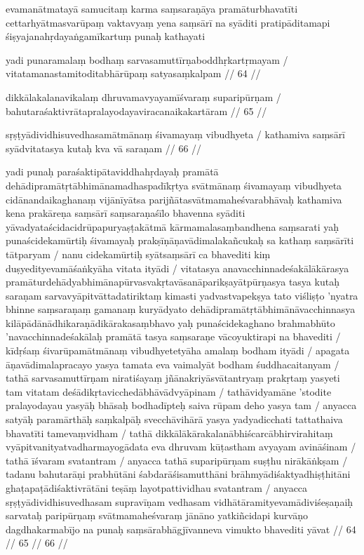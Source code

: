 evamanātmatayā samucitaṃ karma saṃsaraṇāya pramāturbhavatīti cettarhyātmasvarūpaṃ vaktavyaṃ yena saṃsārī na syāditi pratipāditamapi śiṣyajanahṛdayaṅgamīkartuṃ punaḥ kathayati

yadi punaramalaṃ bodhaṃ sarvasamuttīrṇaboddhṛkartṛmayam  /
vitatamanastamitoditabhārūpaṃ satyasaṃkalpam  // 64  //

dikkālakalanavikalaṃ dhruvamavyayamīśvaraṃ suparipūrṇam  /
bahutaraśaktivrātapralayodayaviracanaikakartāram  // 65  //

sṛṣṭyādividhisuvedhasamātmānaṃ śivamayaṃ vibudhyeta  /
kathamiva saṃsārī syādvitatasya kutaḥ kva vā saraṇam  // 66  //

yadi punaḥ paraśaktipātaviddhahṛdayaḥ pramātā dehādipramātṛtābhimānamadhaspadīkṛtya svātmānaṃ śivamayaṃ vibudhyeta cidānandaikaghanaṃ vijānīyātsa parijñātasvātmamaheśvarabhāvaḥ kathamiva kena prakāreṇa saṃsārī saṃsaraṇaśīlo bhavenna syāditi yāvadyataścidacidrūpapuryaṣṭakātmā kārmamalasaṃbandhena saṃsarati yaḥ punaścidekamūrtiḥ śivamayaḥ prakṣīṇāṇavādimalakañcukaḥ sa kathaṃ saṃsārīti tātparyam  / nanu cidekamūrtiḥ syātsaṃsārī ca bhavediti kiṃ duṣyedityevamāśaṅkyāha vitata ityādi  / vitatasya anavacchinnadeśakālākārasya pramāturdehādyabhimānapūrvasvakṛtavāsanāparikṣayātpūrṇasya tasya kutaḥ saraṇam sarvavyāpitvāttadatiriktaṃ kimasti yadvastvapekṣya tato viśliṣṭo 'nyatra bhinne saṃsaraṇaṃ gamanaṃ kuryādyato dehādipramātṛtābhimānāvacchinnasya kilāpādānādhikaraṇādikārakasaṃbhavo yaḥ punaścidekaghano brahmabhūto 'navacchinnadeśakālaḥ pramātā tasya saṃsaraṇe vācoyuktirapi na bhavediti  / kīdṛśaṃ śivarūpamātmānaṃ vibudhyetetyāha amalaṃ bodham ityādi  / apagata āṇavādimalapracayo yasya tamata eva vaimalyāt bodham śuddhacaitanyam  / tathā sarvasamuttīrṇam niratiśayaṃ jñānakriyāsvātantryaṃ prakṛtaṃ yasyeti tam vitatam deśādikṛtavicchedābhāvādvyāpinam  / tathāvidyamāne 'stodite pralayodayau yasyāḥ bhāsaḥ bodhadīpteḥ saiva rūpam deho yasya tam  / anyacca satyāḥ paramārthāḥ saṃkalpāḥ svecchāvihārā yasya yadyadicchati tattathaiva bhavatīti tamevaṃvidham  / tathā dikkālākārakalanābhiścarcābhirvirahitaṃ vyāpitvanityatvadharmayogādata eva dhruvam kūṭastham avyayam avināśinam  / tathā īśvaram svatantram  / anyacca tathā suparipūrṇam suṣṭhu nirākāṅkṣam  / tadanu bahutarāṇi prabhūtāni śabdarāśisamutthāni brāhmyādiśaktyadhiṣṭhitāni ghaṭapaṭādiśaktivrātāni teṣāṃ layotpattividhau svatantram  / anyacca sṛṣṭyādividhisuvedhasam supravīṇam vedhasam vidhātāramityevamādiviśeṣaṇaiḥ
sarvataḥ paripūrṇaṃ svātmamaheśvaraṃ jānāno yatkiñcidapi kurvāṇo dagdhakarmabījo na punaḥ saṃsārabhāgjīvanneva vimukto bhavediti yāvat  // 64  // 65  // 66  //

